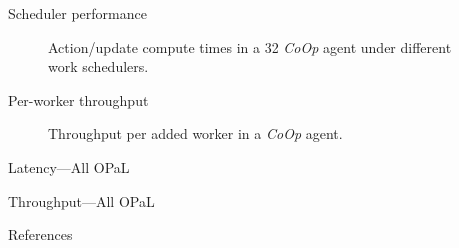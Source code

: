 \documentclass[aspectratio=169,xcolor={dvipsnames}
,handout
]{beamer}
\newcommand{\approachshort}{OPaL}
\newcommand{\Coopfw}{\emph{CoOp}}
\begin{document}
\begin{frame}{Scheduler performance}
	\begin{figure}
		\caption{Action/update compute times in a \SI{32}{\bit} \Coopfw{} agent under different work schedulers.\label{fig:work-alloc-32}}
	\end{figure}
\end{frame}

\begin{frame}{Per-worker throughput}
	\begin{figure}
		\caption{Throughput per added worker in a \Coopfw{} agent.\label{fig:tput-per-core}}
	\end{figure}
\end{frame}

\begin{frame}{Latency---All \approachshort}
	\centering
\end{frame}

\begin{frame}{Throughput---All \approachshort}
	\centering
\end{frame}

\begin{frame}[allowframebreaks]{References}
	\printbibliography[heading=none]
\end{frame}
\end{document}
